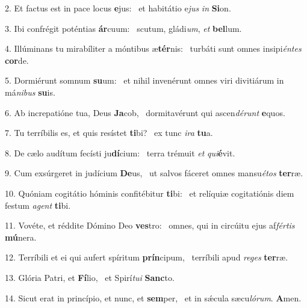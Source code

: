 2. Et factus est in pace locus \textbf{e}jus: \ast\  et habitátio e\textit{jus} \textit{in} \textbf{Si}on.\

3. Ibi confrégit poténtias \textbf{ár}cuum: \ast\  scutum, gládi\textit{um}, \textit{et} \textbf{bel}lum.\

4. Illúminans tu mirabíliter a móntibus æ\textbf{tér}nis: \ast\  turbáti sunt omnes insipi\textit{én}\textit{tes} \textbf{cor}de.\

5. Dormiérunt somnum \textbf{su}um: \ast\  et nihil invenérunt omnes viri divitiárum in má\textit{ni}\textit{bus} \textbf{su}is.\

6. Ab increpatióne tua, Deus \textbf{Ja}cob, \ast\  dormitavérunt qui ascen\textit{dé}\textit{runt} \textbf{e}quos.\

7. Tu terríbilis es, et quis resístet \textbf{ti}bi? \ast\  ex tunc \textit{i}\textit{ra} \textbf{tu}a.\

8. De cælo audítum fecísti ju\textbf{dí}cium: \ast\  terra trémuit \textit{et} \textit{qui}\textbf{é}vit.\

9. Cum exsúrgeret in judícium \textbf{De}us, \ast\  ut salvos fáceret omnes mansu\textit{é}\textit{tos} \textbf{ter}ræ.\

10. Quóniam cogitátio hóminis confitébitur \textbf{ti}bi: \ast\  et relíquiæ cogitatiónis diem festum \textit{a}\textit{gent} \textbf{ti}bi.\

11. Vovéte, et réddite Dómino Deo \textbf{ves}tro: \ast\  omnes, qui in circúitu ejus af\textit{fér}\textit{tis} \textbf{mú}nera.\

12. Terríbili et ei qui aufert spíritum \textbf{prín}cipum, \ast\  terríbili apud \textit{re}\textit{ges} \textbf{ter}ræ.\

13. Glória Patri, et \textbf{Fí}lio, \ast\  et Spirí\textit{tu}\textit{i} \textbf{Sanc}to.\

14. Sicut erat in princípio, et nunc, et \textbf{sem}per, \ast\  et in sǽcula sæcu\textit{ló}\textit{rum}. \textbf{A}men.\

